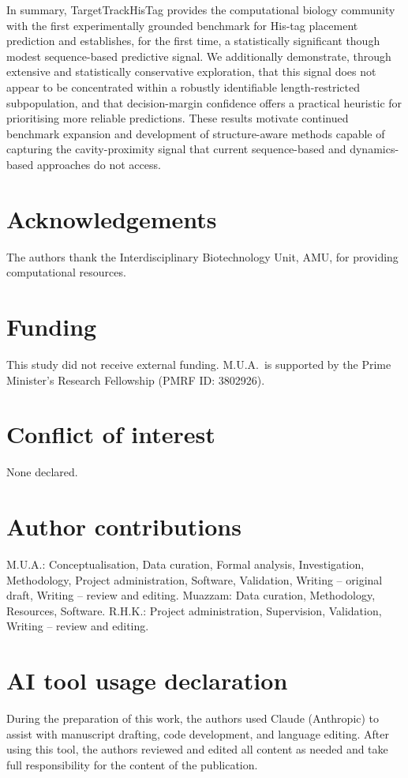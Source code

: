 \documentclass[unnumsec,webpdf,contemporary,large]{oup-authoring-template}
\begin{document}
In summary, TargetTrackHisTag provides the computational biology community with the first experimentally grounded benchmark for His-tag placement prediction and establishes, for the first time, a statistically significant though modest sequence-based predictive signal. We additionally demonstrate, through extensive and statistically conservative exploration, that this signal does not appear to be concentrated within a robustly identifiable length-restricted subpopulation, and that decision-margin confidence offers a practical heuristic for prioritising more reliable predictions. These results motivate continued benchmark expansion and development of structure-aware methods capable of capturing the cavity-proximity signal that current sequence-based and dynamics-based approaches do not access.

\section*{Acknowledgements}
The authors thank the Interdisciplinary Biotechnology Unit, AMU, for providing computational resources.

\section*{Funding}
This study did not receive external funding. M.U.A.\ is supported by the Prime Minister's Research Fellowship (PMRF ID: 3802926).

\section*{Conflict of interest}
None declared.

\section*{Author contributions}
M.U.A.: Conceptualisation, Data curation, Formal analysis, Investigation, Methodology, Project administration, Software, Validation, Writing -- original draft, Writing -- review and editing. Muazzam: Data curation, Methodology, Resources, Software. R.H.K.: Project administration, Supervision, Validation, Writing -- review and editing.

\section*{AI tool usage declaration}
During the preparation of this work, the authors used Claude (Anthropic) to assist with manuscript drafting, code development, and language editing. After using this tool, the authors reviewed and edited all content as needed and take full responsibility for the content of the publication.
\end{document}

